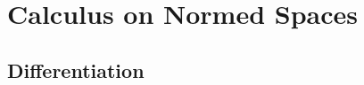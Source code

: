 \documentclass[crop=false,class=article,oneside]{standalone}
\begin{document}
    \ifx\ifsub\undefined
        \section*{Calculus on Normed Spaces}
        \setcounter{section}{1}
    \fi
    \subsection{Differentiation}
\end{document}

